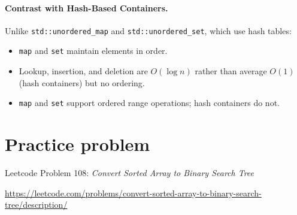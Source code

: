 \documentclass{article}
\begin{document}
\paragraph{Contrast with Hash-Based Containers.}  
Unlike \verb|std::unordered_map| and \verb|std::unordered_set|, which use hash tables:
\begin{itemize}
  \item \verb|map| and \verb|set| maintain elements in order.
  \item Lookup, insertion, and deletion are $O(\log n)$ rather than average $O(1)$ (hash containers) but no ordering.
  \item \verb|map| and \verb|set| support ordered range operations; hash containers do not.
\end{itemize}


\section{Practice problem}
Leetcode Problem 108: \textit{Convert Sorted Array to Binary Search Tree}

\url{https://leetcode.com/problems/convert-sorted-array-to-binary-search-tree/description/}
\end{document}
